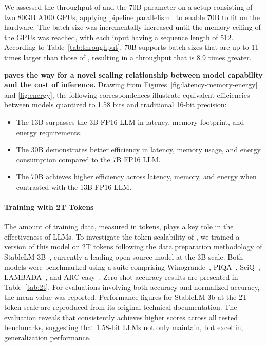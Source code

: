 We assessed the throughput of  and the 70B-parameter  on a setup consisting of two 80GB A100 GPUs, applying pipeline parallelism~\cite{gpipe} to enable  70B to fit on the hardware. The batch size was incrementally increased until the memory ceiling of the GPUs was reached, with each input having a sequence length of 512. According to Table~\ref{tab:throughput},  70B supports batch sizes that are up to 11 times larger than those of , resulting in a throughput that is 8.9 times greater.

\textbf{ paves the way for a novel scaling relationship between model capability and the cost of inference.} Drawing from Figures~\ref{fig:latency-memory-energy} and \ref{fig:energy}, the following correspondences illustrate equivalent efficiencies between models quantized to 1.58 bits and traditional 16-bit precision:

\begin{itemize}
    \item The 13B  surpasses the 3B FP16 LLM in latency, memory footprint, and energy requirements.
    \item The 30B  demonstrates better efficiency in latency, memory usage, and energy consumption compared to the 7B FP16 LLM.
    \item The 70B  achieves higher efficiency across latency, memory, and energy when contrasted with the 13B FP16 LLM.
\end{itemize}

\paragraph{Training with 2T Tokens}

The amount of training data, measured in tokens, plays a key role in the effectiveness of LLMs. To investigate the token scalability of , we trained a version of this model on 2T tokens following the data preparation methodology of StableLM-3B~\cite{StableLM-3B-4E1T}, currently a leading open-source model at the 3B scale. Both models were benchmarked using a suite comprising Winogrande~\cite{winoGrande}, PIQA~\cite{piqa}, SciQ~\cite{sciq}, LAMBADA~\cite{lambada}, and ARC-easy~\cite{arc}. Zero-shot accuracy results are presented in Table~\ref{tab:2t}. For evaluations involving both accuracy and normalized accuracy, the mean value was reported. Performance figures for StableLM 3b at the 2T-token scale are reproduced from its original technical documentation. The evaluation reveals that  consistently achieves higher scores across all tested benchmarks, suggesting that 1.58-bit LLMs not only maintain, but excel in, generalization performance.

